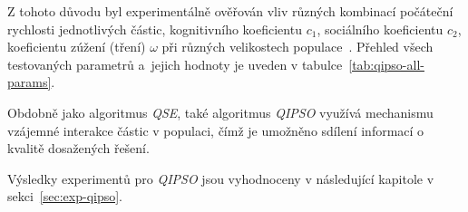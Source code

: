 Z tohoto důvodu byl experimentálně ověřován vliv různých kombinací počáteční rychlosti jednotlivých částic, kognitivního koeficientu $c_1$, sociálního koeficientu $c_2$, koeficientu zúžení (tření) $\omega$ při různých velikostech populace~\cite{pso-app, PSO-c1c2w,PSO-X}. 
Přehled všech testovaných parametrů a~jejich hodnoty je uveden v tabulce~\ref{tab:qipso-all-params}.

Obdobně jako algoritmus \emph{QSE}, také algoritmus \emph{QIPSO} využívá mechanismu vzájemné interakce částic v populaci, čímž je umožněno sdílení informací o kvalitě dosažených řešení. 

Výsledky experimentů pro \emph{QIPSO} jsou vyhodnoceny v následující kapitole v sekci~\ref{sec:exp-qipso}.




